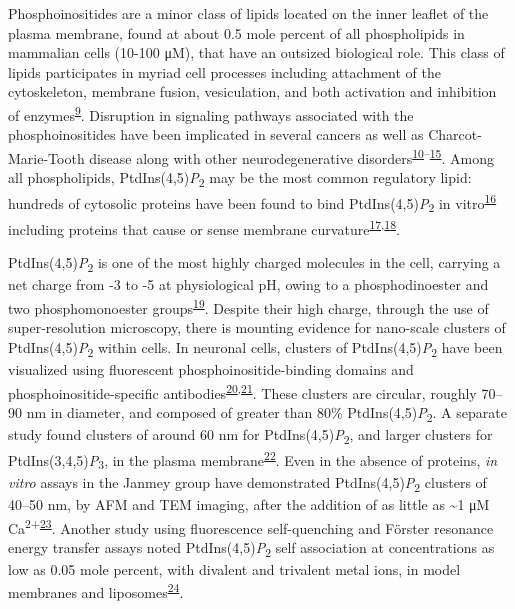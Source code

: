 \documentclass[11pt,notitlepage]{article}
\begin{document}
Phosphoinositides are a minor class of lipids located on the inner
leaflet of the plasma membrane, found at about 0.5 mole percent of all
phospholipids in mammalian cells (10-100 μM), that have an outsized
biological role. This class of lipids participates in myriad cell
processes including attachment of the cytoskeleton, membrane fusion,
vesiculation, and both activation and inhibition of
enzymes\textsuperscript{\protect\hyperlink{ref-GGlssBvj}{9}}. Disruption
in signaling pathways associated with the phosphoinositides have been
implicated in several cancers as well as Charcot-Marie-Tooth disease
along with other neurodegenerative
disorders\textsuperscript{\protect\hyperlink{ref-8Xw2kuUO}{10}--\protect\hyperlink{ref-1DCzqvykg}{15}}.
Among all phospholipids, PtdIns(4,5)\emph{P}\textsubscript{2} may be the
most common regulatory lipid: hundreds of cytosolic proteins have been
found to bind PtdIns(4,5)\emph{P}\textsubscript{2} in
vitro\textsuperscript{\protect\hyperlink{ref-uyKE7bWV}{16}} including
proteins that cause or sense membrane
curvature\textsuperscript{\protect\hyperlink{ref-3EmJ4esY}{17},\protect\hyperlink{ref-5PUA7pLD}{18}}.

PtdIns(4,5)\emph{P}\textsubscript{2} is one of the most highly charged
molecules in the cell, carrying a net charge from -3 to -5 at
physiological pH, owing to a phosphodinoester and two phosphomonoester
groups\textsuperscript{\protect\hyperlink{ref-8pFCG7HG}{19}}. Despite
their high charge, through the use of super-resolution microscopy, there
is mounting evidence for nano-scale clusters of
PtdIns(4,5)\emph{P}\textsubscript{2} within cells. In neuronal cells,
clusters of PtdIns(4,5)\emph{P}\textsubscript{2} have been visualized
using fluorescent phosphoinositide-binding domains and
phosphoinositide-specific
antibodies\textsuperscript{\protect\hyperlink{ref-U2YHSNKE}{20},\protect\hyperlink{ref-Gw4f4Ayu}{21}}.
These clusters are circular, roughly 70--90 nm in diameter, and composed
of greater than 80\% PtdIns(4,5)\emph{P}\textsubscript{2}. A separate
study found clusters of around 60 nm for
PtdIns(4,5)\emph{P}\textsubscript{2}, and larger clusters for
PtdIns(3,4,5)\emph{P}\textsubscript{3}, in the plasma
membrane\textsuperscript{\protect\hyperlink{ref-rvpDeSHJ}{22}}. Even in
the absence of proteins, \emph{in vitro} assays in the Janmey group have
demonstrated PtdIns(4,5)\emph{P}\textsubscript{2} clusters of 40--50 nm,
by AFM and TEM imaging, after the addition of as little as
\textasciitilde{}1 μM
Ca\textsuperscript{2+}\textsuperscript{\protect\hyperlink{ref-LhOwGz4k}{23}}.
Another study using fluorescence self-quenching and Förster resonance
energy transfer assays noted PtdIns(4,5)\emph{P}\textsubscript{2} self
association at concentrations as low as 0.05 mole percent, with divalent
and trivalent metal ions, in model membranes and
liposomes\textsuperscript{\protect\hyperlink{ref-ior8wlwH}{24}}.
\end{document}
